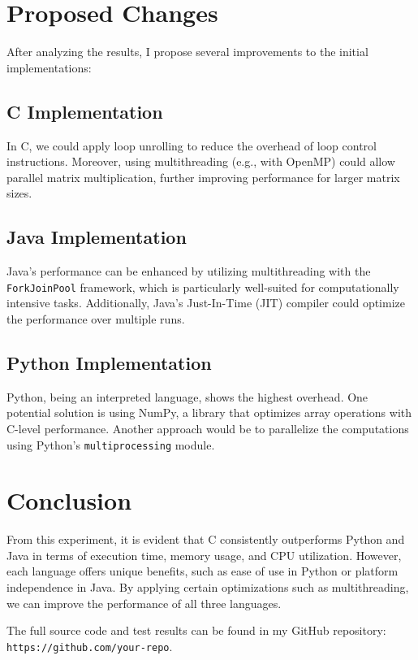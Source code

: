 \documentclass{article}
\begin{document}
\section{Proposed Changes}

After analyzing the results, I propose several improvements to the initial implementations:

\subsection{C Implementation}
In C, we could apply loop unrolling to reduce the overhead of loop control instructions. Moreover, using multithreading (e.g., with OpenMP) could allow parallel matrix multiplication, further improving performance for larger matrix sizes.

\subsection{Java Implementation}
Java's performance can be enhanced by utilizing multithreading with the \texttt{ForkJoinPool} framework, which is particularly well-suited for computationally intensive tasks. Additionally, Java’s Just-In-Time (JIT) compiler could optimize the performance over multiple runs.

\subsection{Python Implementation}
Python, being an interpreted language, shows the highest overhead. One potential solution is using NumPy, a library that optimizes array operations with C-level performance. Another approach would be to parallelize the computations using Python's \texttt{multiprocessing} module.

\section{Conclusion}

From this experiment, it is evident that C consistently outperforms Python and Java in terms of execution time, memory usage, and CPU utilization. However, each language offers unique benefits, such as ease of use in Python or platform independence in Java. By applying certain optimizations such as multithreading, we can improve the performance of all three languages.

The full source code and test results can be found in my GitHub repository: \texttt{https://github.com/your-repo}.
\end{document}
